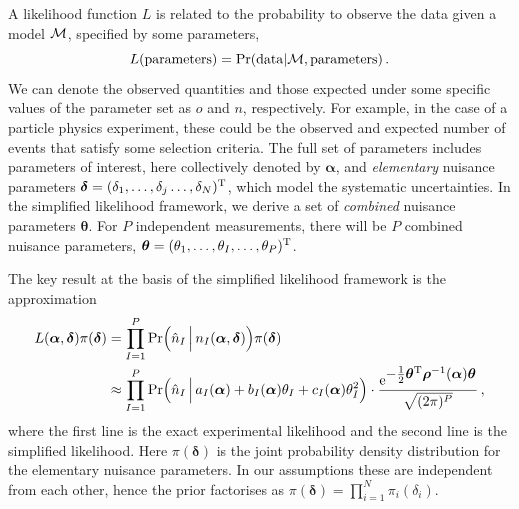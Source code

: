 \documentclass[11pt]{article}
\newcommand{\be}{\begin{equation}}
\newcommand{\ee}{\end{equation}}
\begin{document}
A likelihood function $L$ is related to the probability to observe the data given a model $\cal M$, specified by some parameters,
\be L({\rm parameters})={\rm Pr}({\rm data}|{\cal M},{\rm parameters})\,.\ee
We can denote the observed quantities and those expected under some specific values of the parameter set as $o$ and $n$, respectively. For example, in the case of
a particle physics experiment, these could be the observed and expected number of events that satisfy some selection criteria.
The full set of parameters includes parameters of interest, here collectively denoted by $\bm{\alpha}$, and \textit{elementary} nuisance parameters $\bm{\delta}=(\delta_1,\ldots,\delta_{j}\ldots,\delta_N)^{\rm{T}}$, which model the systematic uncertainties.
In the simplified likelihood framework, we derive a set of \textit{combined} nuisance parameters $\bm{\theta}$. For $P$ independent measurements, there will be $P$ combined nuisance parameters, $\bm{\theta}=(\theta_1,\ldots,\theta_{I},\ldots,\theta_P)^{\rm{T}}$.


The key result at the basis of  the simplified likelihood framework is the approximation
\begin{align}
  L(\bm{\alpha},\bm{\delta} )\pi(\bm{\delta})
  & = \prod_{I=1}^P \mathrm{Pr}\Big(  \hat n_I\,\Big|\,n_I(\bm{\alpha},\bm{\delta})  \Big) \pi(\bm{\delta}) \label{eq:EL} \\
  & \approx \prod_{I=1}^P \mathrm{Pr}\Big( \hat n_I\,\Big|\,a_{I}(\bm \alpha)+b_I(\bm \alpha)\theta_I+c_I(\bm \alpha)\theta_I^2  \Big) \cdot
    \frac{ \mathrm{e}^{{\textstyle-\frac{1}{2}\bm \theta^{\rm T} \bm{\rho}^{-1}(\bm \alpha) \bm \theta}}}{\sqrt{(2\pi)^P }} \,, \label{eq:SL_master}
\end{align}
where the first line is the exact experimental likelihood and the second line is the simplified likelihood. Here $\pi(\bm \delta)$ is the joint probability density distribution for the elementary nuisance parameters. In our assumptions  these are independent from each other, hence the prior factorises as $\pi(\bm \delta)=\prod_{i=1}^N \pi_i(\delta_i)$.
\end{document}
